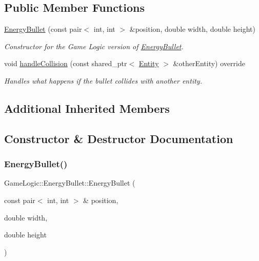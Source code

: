 \subsection*{Public Member Functions}
\begin{DoxyCompactItemize}
\item 
\hyperlink{classGameLogic_1_1EnergyBullet_a0186eb8346b81f63fb1c0e8312cbb583}{Energy\+Bullet} (const pair$<$ int, int $>$ \&position, double width, double height)
\begin{DoxyCompactList}\small\item\em Constructor for the Game Logic version of \hyperlink{classGameLogic_1_1EnergyBullet}{Energy\+Bullet}. \end{DoxyCompactList}\item 
void \hyperlink{classGameLogic_1_1EnergyBullet_a5eafebaf5fccf0a3bf3375def4ff32d2}{handle\+Collision} (const shared\+\_\+ptr$<$ \hyperlink{classGameLogic_1_1Entity}{Entity} $>$ \&other\+Entity) override
\begin{DoxyCompactList}\small\item\em Handles what happens if the bullet collides with another entity. \end{DoxyCompactList}\end{DoxyCompactItemize}
\subsection*{Additional Inherited Members}


\subsection{Constructor \& Destructor Documentation}
\mbox{\label{classGameLogic_1_1EnergyBullet_a0186eb8346b81f63fb1c0e8312cbb583}} 
\subsubsection{\texorpdfstring{Energy\+Bullet()}{EnergyBullet()}}
{\footnotesize\ttfamily Game\+Logic\+::\+Energy\+Bullet\+::\+Energy\+Bullet (\begin{DoxyParamCaption}\item[{const pair$<$ int, int $>$ \&}]{position,  }\item[{double}]{width,  }\item[{double}]{height }\end{DoxyParamCaption})}

